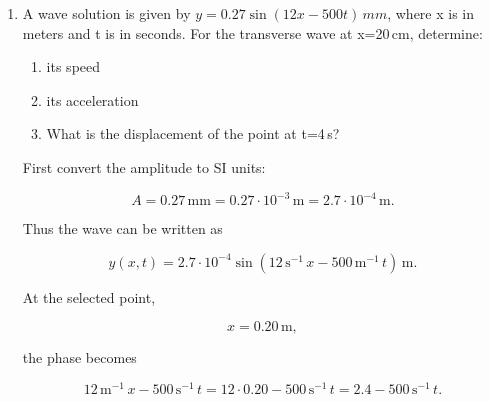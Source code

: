 \documentclass[t,aspectratio=169]{beamer}
\begin{document}
\begin{frame}
\begin{enumerate}
$$\boxed{y(x,t)=2\cdot10^{-3}\sin(60\pi\,\mathrm{s^{-1}}\,t-10.47\,\mathrm{m^{-1}}\,x)\,\mathrm{m}}.$$
  
\pagebreak
\item A wave solution is given by $y = 0.27 \sin(12x - 500t)\,mm$, where x is in meters and t is in seconds. For the transverse wave at x=20\,cm, determine:
\begin{enumerate}
\item[a)] its speed
\item[b)] its acceleration
\item[c)] What is the displacement of the point at t=4\,s?
\end{enumerate}

\begin{center}
\end{center}

First convert the amplitude to SI units:

$$A=0.27\,\mathrm{mm}=0.27\cdot10^{-3}\,\mathrm{m}=2.7\cdot10^{-4}\,\mathrm{m}.$$

Thus the wave can be written as

$$y(x,t)=2.7\cdot10^{-4}\sin(12\,\mathrm{s^{-1}}\,x-500\,\mathrm{m^{-1}}\,t)\,\mathrm{m}.$$

At the selected point,

$$x=0.20\,\mathrm{m},$$

the phase becomes

$$12\,\mathrm{m^{-1}}\,x-500\,\mathrm{s^{-1}}\,t=12\cdot0.20-500\,\mathrm{s^{-1}}\,t=2.4-500\,\mathrm{s^{-1}}\,t.$$


\end{enumerate}
\end{frame}
\end{document}
